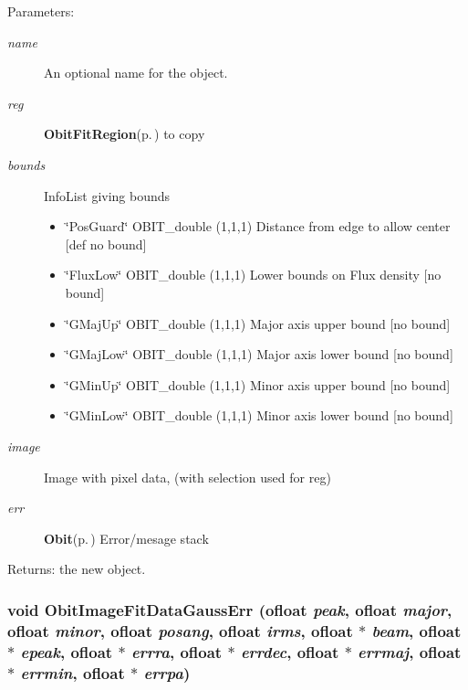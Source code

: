 \begin{Desc}
\item[Parameters:]
\begin{description}
\item[{\em name}]An optional name for the object. \item[{\em reg}]{\bf Obit\-Fit\-Region}{\rm (p.\,\pageref{structObitFitRegion})} to copy \item[{\em bounds}]Info\-List giving bounds \begin{itemize}
\item \char`\"{}Pos\-Guard\char`\"{} OBIT\_\-double (1,1,1) Distance from edge to allow center [def no bound] \item \char`\"{}Flux\-Low\char`\"{} OBIT\_\-double (1,1,1) Lower bounds on Flux density [no bound] \item \char`\"{}GMaj\-Up\char`\"{} OBIT\_\-double (1,1,1) Major axis upper bound [no bound] \item \char`\"{}GMaj\-Low\char`\"{} OBIT\_\-double (1,1,1) Major axis lower bound [no bound] \item \char`\"{}GMin\-Up\char`\"{} OBIT\_\-double (1,1,1) Minor axis upper bound [no bound] \item \char`\"{}GMin\-Low\char`\"{} OBIT\_\-double (1,1,1) Minor axis lower bound [no bound] \end{itemize}
\item[{\em image}]Image with pixel data, (with selection used for reg) \item[{\em err}]{\bf Obit}{\rm (p.\,\pageref{structObit})} Error/mesage stack \end{description}
\end{Desc}
\begin{Desc}
\item[Returns:]the new object. \end{Desc}
\subsubsection{\setlength{\rightskip}{0pt plus 5cm}void Obit\-Image\-Fit\-Data\-Gauss\-Err ({\bf ofloat} {\em peak}, {\bf ofloat} {\em major}, {\bf ofloat} {\em minor}, {\bf ofloat} {\em posang}, {\bf ofloat} {\em irms}, {\bf ofloat} $\ast$ {\em beam}, {\bf ofloat} $\ast$ {\em epeak}, {\bf ofloat} $\ast$ {\em errra}, {\bf ofloat} $\ast$ {\em errdec}, {\bf ofloat} $\ast$ {\em errmaj}, {\bf ofloat} $\ast$ {\em errmin}, {\bf ofloat} $\ast$ {\em errpa})}\label{ObitImageFitData_8c_a11}


